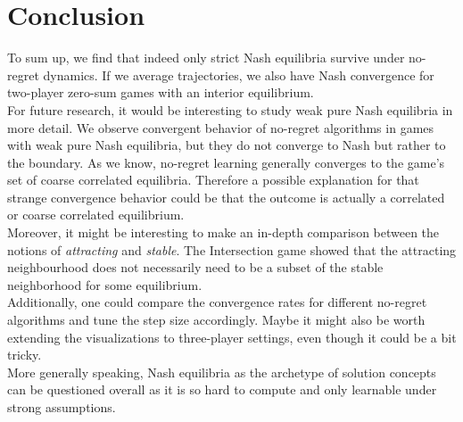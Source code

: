 
\chapter{Conclusion}\label{chapter:conclusion}

To sum up, we find that indeed only strict Nash equilibria survive under no-regret dynamics. If we average trajectories, we also have Nash convergence for two-player zero-sum games with an interior equilibrium. \\

For future research, it would be interesting to study weak pure Nash equilibria in more detail. We observe convergent behavior of no-regret algorithms in games with weak pure Nash equilibria, but they do not converge to Nash but rather to the boundary. As we know, no-regret learning generally converges to the game's set of coarse correlated equilibria. Therefore a possible explanation for that strange convergence behavior could be that the outcome is actually a correlated or coarse correlated equilibrium. \\

Moreover, it might be interesting to make an in-depth comparison between the notions of \textit{attracting} and \textit{stable}. The Intersection game showed that the attracting neighbourhood does not necessarily need to be a subset of the stable neighborhood for some equilibrium. \\

Additionally, one could compare the convergence rates for different no-regret algorithms and tune the step size accordingly. Maybe it might also be worth extending the visualizations to three-player settings, even though it could be a bit tricky. \\

More generally speaking, Nash equilibria as the archetype of solution concepts can be questioned overall as it is so hard to compute and only learnable under strong assumptions. 